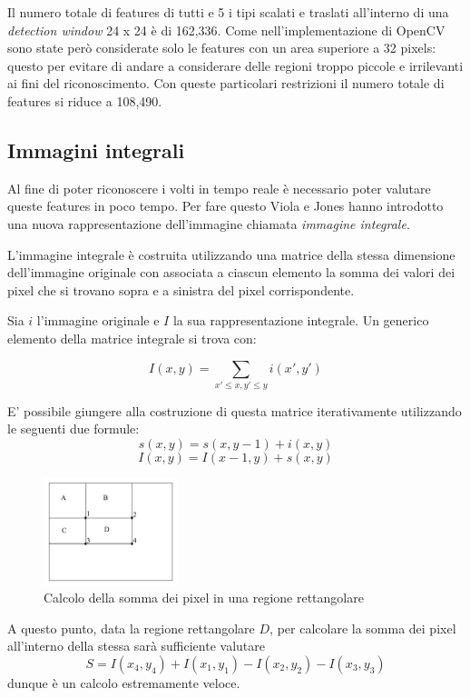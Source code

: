 Il numero totale di features di tutti e 5 i tipi scalati e traslati all'interno di una \emph{detection window} 24 x 24 è di 162,336. Come nell'implementazione di OpenCV sono state però considerate solo le features con un area superiore a 32 pixels: questo per evitare di andare a considerare delle regioni troppo piccole e irrilevanti ai fini del riconoscimento. Con queste particolari restrizioni il numero totale di features si riduce a 108,490. 

\subsection{Immagini integrali}

Al fine di poter riconoscere i volti in tempo reale è necessario poter valutare queste features in poco tempo. Per fare questo Viola e Jones hanno introdotto una nuova rappresentazione dell'immagine chiamata \emph{immagine integrale}.

L'immagine integrale è costruita utilizzando una matrice della stessa dimensione dell'immagine originale con associata a ciascun elemento la somma dei valori dei pixel che si trovano sopra e a sinistra del pixel corrispondente.

Sia $i$ l'immagine originale e $I$ la sua rappresentazione integrale. Un generico elemento della matrice integrale si trova con:

$$
I(x, y) = \sum_{x' \leq x, y' \leq y} i(x', y')
$$

E' possibile giungere alla costruzione di questa matrice iterativamente utilizzando le seguenti due formule:
$$
s(x, y) = s(x, y - 1) + i(x, y)
$$
$$
I(x, y) = I(x - 1, y) + s(x, y)
$$

\begin{figure}[h]
\begin{center}
\includegraphics[width=0.35\textwidth]{images/integral}
\end{center}
  \caption{Calcolo della somma dei pixel in una regione rettangolare}
\label{fig:integral}
\end{figure}
A questo punto, data la regione rettangolare $D$, per calcolare la somma dei pixel all'interno della stessa sarà sufficiente valutare
$$
S = I(x_4, y_4) + I(x_1, y_1) - I(x_2, y_2) - I(x_3, y_3)
$$
dunque è un calcolo estremamente veloce.


